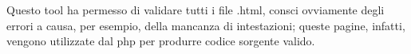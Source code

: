 Questo tool ha permesso di validare tutti i file .html, consci ovviamente degli errori a causa, per esempio, della mancanza di intestazioni; queste pagine, infatti, vengono utilizzate dal php per produrre codice sorgente valido.